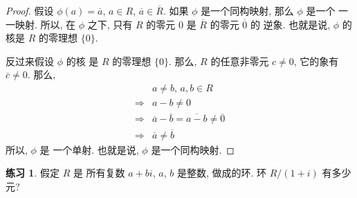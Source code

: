 \documentclass[utf8]{ctexbook}
\theoremstyle{definition}
\newtheorem{exercise}{练习}[section]
\begin{document}
\begin{proof}
假设 $\phi(a) = \overline{a}$, $a \in R$, $\overline{a} \in \overline{R}$. 如果 $\phi$ 是一个同构映射, 那么 $\phi$ 是一个 一一映射. 所以, 在 $\phi$ 之下, 只有 $R$ 的零元 $0$ 是 $\overline{R}$ 的零元 $\overline{0}$ 的 逆象. 也就是说, $\phi$ 的核是 $R$ 的零理想 $\{0\}$.

反过来假设 $\phi$ 的核 是 $R$ 的零理想 $\{ 0 \}$. 那么, $R$ 的任意非零元 $c \neq 0$, 它的象有 $\overline{c} \neq 0$. 那么,
\begin{align*}
& a \neq b,\, a, b \in R \\
\Longrightarrow & a - b \neq 0 \\
\Longrightarrow & \overline{a} - \overline{b} = \overline{a - b} \neq \overline{0} \\
\Longrightarrow & \overline{a} \neq \overline{b}
\end{align*}
所以, $\phi$ 是 一个单射. 也就是说, $\phi$ 是一个同构映射.
\end{proof}

\begin{exercise}\label{exercise_quotient_ring_R_1_i}
假定 $R$ 是 所有复数 $a + b i $, $a$, $b$ 是整数, 做成的环. 环 $R/(1+i)$ 有多少元?
\end{exercise}
\end{document}
